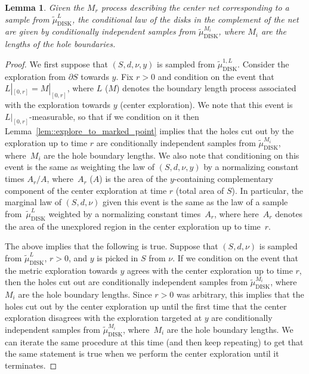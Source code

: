 \documentclass[JEP,XML,SOM,Unicode]{cedram}
\theoremstyle{plain}
\numberwithin{theorem}{section}
\newtheorem{lemma}[theorem]{Lemma}
\theoremstyle{definition}
\newcommand{\tmudonel}{\wt{\mu}_{ \mathrm{DISK}}^{1, L}}
\newcommand{\tmudl}{\wt{\mu}_{\mathrm{DISK}}^L}
\def\tmudlset#1{\wt{\mu}_{\mathrm{DISK}}^{#1}}
\let\wt\widetilde
\begin{document}
\begin{lemma}
\label{lem::exploretocenter}
Given the $M_r$ process describing the center net corresponding to a sample from $\tmudl$, the conditional law of the disks in the complement of the net are given by conditionally independent samples from $\tmudlset{M_i}$, where $M_i$ are the lengths of the hole boundaries.
\end{lemma}
\begin{proof}
We first suppose that $(S,d,\nu,y)$ is sampled from $\tmudonel$. Consider the exploration from $\partial S$ towards $y$. Fix $r > 0$ and condition on the event that $L|_{[0,r]} = M|_{[0,r]}$, where $L$ (\resp $M$) denotes the boundary length process associated with the exploration towards $y$ (\resp center exploration). We note that this event is $L|_{[0,r]}$-measurable, so that if we condition on it then Lemma~\ref{lem::explore_to_marked_point} implies that the holes cut out by the exploration up to time $r$ are conditionally independent samples from $\tmudlset{M_i}$, where~$M_i$ are the hole boundary lengths. We also note that conditioning on this event is the same as weighting the law of $(S,d,\nu,y)$ by a normalizing constant times $A_r/A$, where~$A_r$ (\resp $A$) is the area of the $y$-containing complementary component of the center exploration at time $r$ (\resp total area of $S$). In particular, the marginal law of $(S,d,\nu)$ given this event is the same as the law of a sample from~$\tmudl$ weighted by a normalizing constant times~$A_r$, where here~$A_r$ denotes the area of the unexplored region in the center exploration up to time~$r$.

The above implies that the following is true. Suppose that $(S,d,\nu)$ is sampled from $\tmudl$, $r > 0$, and $y$ is picked in $S$ from $\nu$. If we condition on the event that the metric exploration towards $y$ agrees with the center exploration up to time $r$, then the holes cut out are conditionally independent samples from $\tmudlset{M_i}$, where $M_i$ are the hole boundary lengths. Since $r > 0$ was arbitrary, this implies that the holes cut out by the center exploration up until the first time that the center exploration disagrees with the exploration targeted at $y$ are conditionally independent samples from $\tmudlset{M_i}$, where~$M_i$ are the hole boundary lengths. We can iterate the same procedure at this time (and then keep repeating) to get that the same statement is true when we perform the center exploration until it terminates.
\end{proof}
\end{document}

